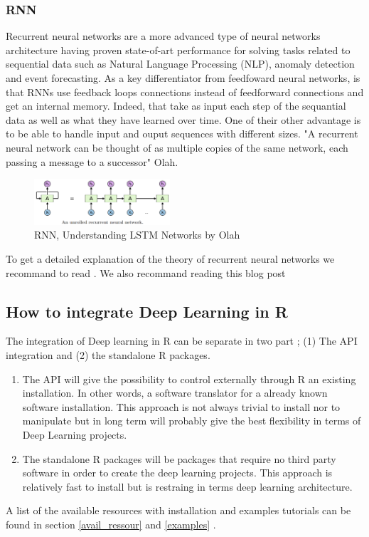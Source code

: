 \documentclass[6pt,letter]{article}\usepackage[]{graphicx}\usepackage[]{color}
\begin{document}
\subsubsection{RNN}
Recurrent neural networks are a more advanced type of neural networks architecture having proven state-of-art performance for solving tasks related to sequential data such as Natural Language Processing (NLP), anomaly detection and event forecasting. As a key differentiator from feedfoward neural networks, is that RNNs use feedback loops connections instead of feedforward connections and get an internal memory. Indeed, that take as input each step of the sequantial data as well as what they have learned over time. One of their other advantage is to be able to handle input and ouput sequences with different sizes. "A recurrent neural network can be thought of as multiple copies of the same network, each passing a message to a successor" Olah.
\begin{figure}[h]
    \centering
    \includegraphics[width=0.45\textwidth]{figure/RNN_process.png}
     \caption{RNN, Understanding LSTM Networks by Olah}
     \label{fig:simule}
\end{figure}

To get a detailed explanation of the theory of recurrent neural networks we recommand to read \cite[Chapter 10]{Goodfellow-et-al-2016}. We also recommand reading this blog post

\subsection{How to integrate Deep Learning in R}
The integration of Deep learning in R can be separate in two part ; (1) The \ac{API} integration and (2) the standalone R packages. 
\begin{enumerate}
\item The \ac{API} will give the possibility to control externally through R an existing installation. In other words, a software translator for a already known software installation. This approach is not always trivial to install nor to manipulate but in long term will probably give the best flexibility in terms of Deep Learning projects.
\item The standalone R packages will be packages that require no third party software in order to create the deep learning projects. This approach is relatively fast to install but is restraing in terms deep learning architecture.
\end{enumerate}
A list of the available resources with installation and examples tutorials can be found in section \ref{avail_ressour} and \ref{examples} .
\end{document}
